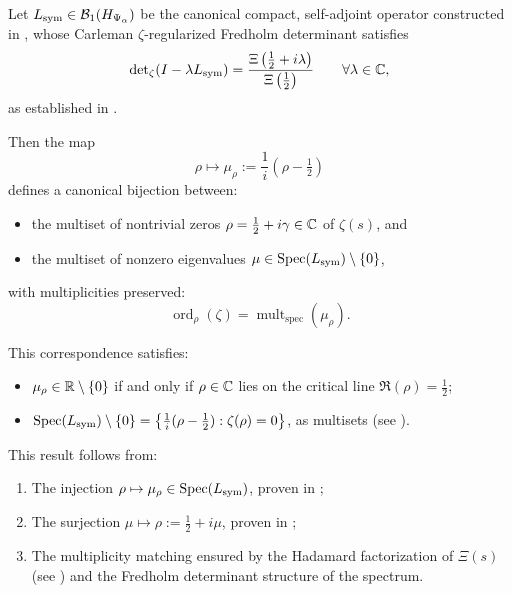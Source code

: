 \begin{theorem}
\label{thm:spectral_zero_bijection_revised}
Let \( L_{\mathrm{sym}} \in \mathcal{B}_1(H_{\Psi_\alpha}) \) be the canonical compact, self-adjoint operator constructed in , whose Carleman \(\zeta\)-regularized Fredholm determinant satisfies
\[
\det\nolimits_{\zeta}(I - \lambda L_{\mathrm{sym}}) = \frac{\Xi\left(\tfrac{1}{2} + i\lambda\right)}{\Xi\left(\tfrac{1}{2}\right)} \qquad \forall \lambda \in \mathbb{C},
\]
as established in .

Then the map
\[
\rho \longmapsto \mu_\rho := \frac{1}{i}(\rho - \tfrac{1}{2})
\]
defines a canonical bijection between:
\begin{itemize}
  \item the multiset of nontrivial zeros \( \rho = \tfrac{1}{2} + i\gamma \in \mathbb{C} \) of \( \zeta(s) \), and
  \item the multiset of nonzero eigenvalues \( \mu \in \operatorname{Spec}(L_{\mathrm{sym}}) \setminus \{0\} \),
\end{itemize}
with multiplicities preserved:
\[
\operatorname{ord}_\rho(\zeta) = \operatorname{mult}_{\mathrm{spec}}(\mu_\rho).
\]

\medskip

\noindent
This correspondence satisfies:
\begin{itemize}
  \item \( \mu_\rho \in \mathbb{R} \setminus \{0\} \) if and only if \( \rho \in \mathbb{C} \) lies on the critical line \( \Re(\rho) = \tfrac{1}{2} \);
  \item \( \operatorname{Spec}(L_{\mathrm{sym}}) \setminus \{0\} = \left\{ \tfrac{1}{i}(\rho - \tfrac{1}{2}) : \zeta(\rho) = 0 \right\} \), as multisets (see ).
\end{itemize}

\medskip

\noindent
This result follows from:
\begin{enumerate}
  \item The injection \( \rho \mapsto \mu_\rho \in \operatorname{Spec}(L_{\mathrm{sym}}) \), proven in ;
  \item The surjection \( \mu \mapsto \rho := \tfrac{1}{2} + i\mu \), proven in ;
  \item The multiplicity matching ensured by the Hadamard factorization of \( \Xi(s) \) (see ) and the Fredholm determinant structure of the spectrum.
\end{enumerate}
\end{theorem}
